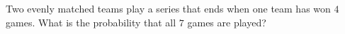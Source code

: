 Two evenly matched teams play a series that ends when one team has won $4$ games. What is the probability that all $7$ games are played?
